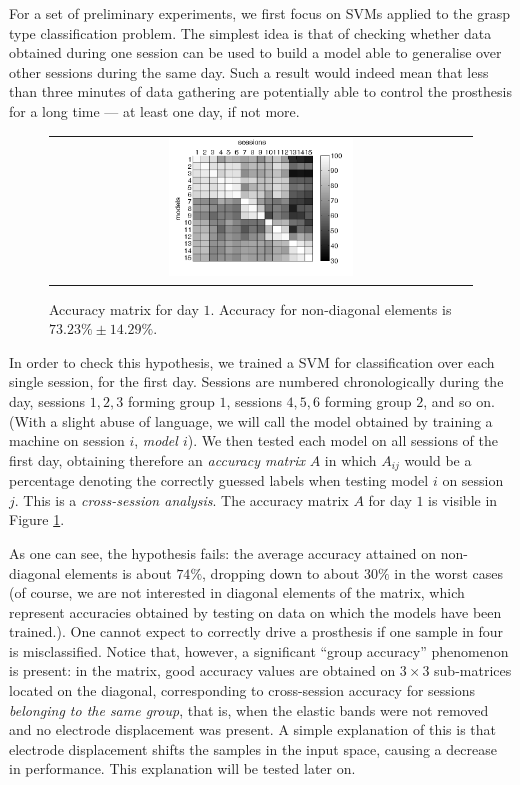 For a set of preliminary experiments, we first focus on SVMs applied
to the grasp type classification problem. The simplest idea is that of
checking whether data obtained during one session can be used to build
a model able to generalise over other sessions during the same
day. Such a result would indeed mean that less than three minutes of
data gathering are potentially able to control the prosthesis for a
long time --- at least one day, if not more.

\begin{figure}[!ht] \centering
  \begin{tabular}{c}
    \includegraphics[width=0.45\textwidth]{figs/fig_resCross1_full.png}
  \end{tabular}
  \caption{Accuracy matrix for day $1$. Accuracy for non-diagonal
    elements is $73.23\% \pm 14.29\%$.}
  \label{fig:cross_first}
\end{figure}

In order to check this hypothesis, we trained a SVM for classification
over each single session, for the first day. Sessions are numbered
chronologically during the day, sessions $1,2,3$ forming group $1$,
sessions $4,5,6$ forming group $2$, and so on. (With a slight abuse of
language, we will call the model obtained by training a machine on
session $i$, \emph{model $i$}). We then tested each model on all
sessions of the first day, obtaining therefore an \emph{accuracy
matrix} $A$ in which $A_{ij}$ would be a percentage denoting the
correctly guessed labels when testing model $i$ on session $j$. This
is a \emph{cross-session analysis}. The accuracy matrix $A$ for day
$1$ is visible in Figure \ref{fig:cross_first}.

As one can see, the hypothesis fails: the average accuracy attained on
non-diagonal elements is about $74\%$, dropping down to about $30\%$
in the worst cases (of course, we are not interested in diagonal
elements of the matrix, which represent accuracies obtained by testing
on data on which the models have been trained.). One cannot expect to
correctly drive a prosthesis if one sample in four is
misclassified. Notice that, however, a significant ``group accuracy''
phenomenon is present: in the matrix, good accuracy values are
obtained on $3\times3$ sub-matrices located on the diagonal,
corresponding to cross-session accuracy for sessions \emph{belonging
to the same group}, that is, when the elastic bands were not removed
and no electrode displacement was present. A simple explanation of
this is that electrode displacement shifts the samples in the input
space, causing a decrease in performance. This explanation will be
tested later on.

